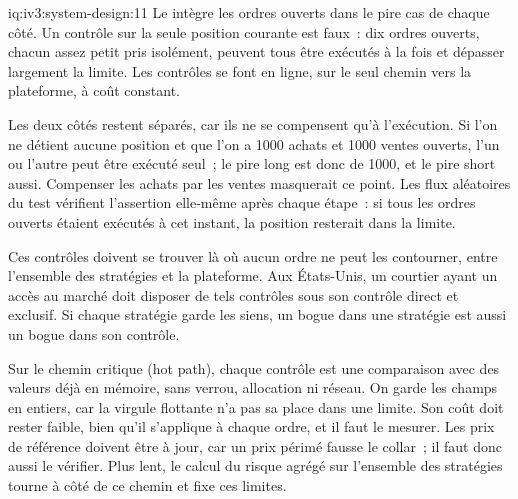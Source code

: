 \begin{solution}{iq:iv3:system-design:11}
Le  intègre les ordres ouverts dans le pire cas de chaque côté. Un contrôle sur la seule position courante est faux~: dix ordres ouverts, chacun assez petit pris isolément, peuvent tous être exécutés à la fois et dépasser largement la limite. Les contrôles se font en ligne, sur le seul chemin vers la plateforme, à coût constant.
\enlargethispage{-3\baselineskip}%
\label{lst:iv3:sd:risk}

Les deux côtés restent séparés, car ils ne se compensent qu'à l'exécution. Si l'on ne détient aucune position et que l'on a 1000 achats et 1000 ventes ouverts, l'un ou l'autre peut être exécuté seul~; le pire long est donc de 1000, et le pire short aussi. Compenser les achats par les ventes masquerait ce point. Les flux aléatoires du test vérifient l'assertion elle-même après chaque étape~: si tous les ordres ouverts étaient exécutés à cet instant, la position resterait dans la limite.

Ces contrôles doivent se trouver là où aucun ordre ne peut les contourner, entre l'ensemble des stratégies et la plateforme. Aux États-Unis, un courtier ayant un accès au marché doit disposer de tels contrôles sous son contrôle direct et exclusif. Si chaque stratégie garde les siens, un bogue dans une stratégie est aussi un bogue dans son contrôle.

Sur le chemin critique (hot path), chaque contrôle est une comparaison avec des valeurs déjà en mémoire, sans verrou, allocation ni réseau. On garde les champs en entiers, car la virgule flottante n'a pas sa place dans une limite. Son coût doit rester faible, bien qu'il s'applique à chaque ordre, et il faut le mesurer. Les prix de référence doivent être à jour, car un prix périmé fausse le collar~; il faut donc aussi le vérifier. Plus lent, le calcul du risque agrégé sur l'ensemble des stratégies tourne à côté de ce chemin et fixe ces limites.

\end{solution}

